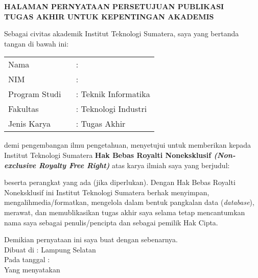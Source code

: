 \clearpage
{}%

\begin{center}
	\smallskip
	
	\normalsize \bfseries \MakeUppercase{
		HALAMAN PERNYATAAN PERSETUJUAN PUBLIKASI \\
		TUGAS AKHIR UNTUK KEPENTINGAN AKADEMIS
	}\linebreak
	
	\normalfont \onehalfspacing \justifying %
	Sebagai civitas akademik Institut Teknologi Sumatera, saya yang bertanda tangan di bawah ini:
	
	\flushleft
	\setlength{\tabcolsep}{0pt}
	\begin{tabular}{l l}
		Nama 			&  : \theauthor\\
		NIM 			&  : \printnim\\
		Program Studi \	&  : Teknik Informatika\\
		Fakultas 		&  : Teknologi Industri\\
		Jenis Karya 	&  : Tugas Akhir\\
	\end{tabular}

	\justifying
	\noindent demi pengembangan ilmu pengetahuan, menyetujui untuk memberikan kepada Institut Teknologi Sumatera \textbf{Hak Bebas Royalti Noneksklusif \textit{(Non-exclusive Royalty Free Right)}} atas karya ilmiah saya yang berjudul:
	
	\centering
	\textbf{\thetitle}
	
	\justifying
	beserta perangkat yang ada (jika diperlukan). Dengan Hak Bebas Royalti Noneksklusif ini Institut Teknologi Sumatera berhak menyimpan, mengalihmedia/formatkan, mengelola dalam bentuk pangkalan data (\textit{database}), merawat, dan memublikasikan tugas akhir saya selama tetap mencantumkan nama saya sebagai penulis/pencipta dan sebagai pemilik Hak Cipta.
	
	Demikian pernyataan ini saya buat dengan sebenarnya. \\
	
	\centering
	Dibuat di : Lampung Selatan\\
	Pada tanggal : \todayIndo\\ %
	\bigskip
	Yang menyatakan\\
	\vspace{1.5cm}
	\theauthor
	
\end{center}
\clearpage
